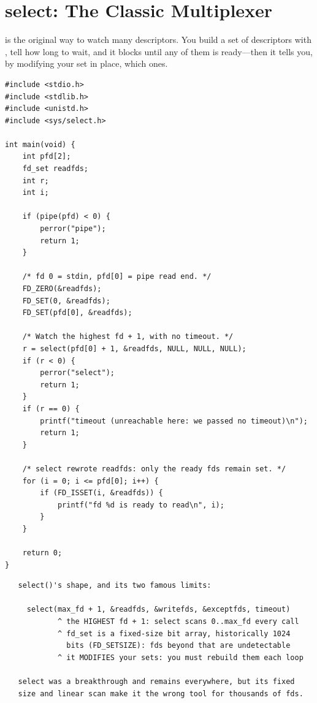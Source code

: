 \section{select: The Classic Multiplexer}

 is the original way to watch many descriptors. You build
a set of descriptors with , tell  how long
to wait, and it blocks until any of them is ready---then it tells you,
by modifying your set in place, which ones.

\begin{lstlisting}[caption={Watching stdin and a pipe with select.}]
#include <stdio.h>
#include <stdlib.h>
#include <unistd.h>
#include <sys/select.h>

int main(void) {
    int pfd[2];
    fd_set readfds;
    int r;
    int i;

    if (pipe(pfd) < 0) {
        perror("pipe");
        return 1;
    }

    /* fd 0 = stdin, pfd[0] = pipe read end. */
    FD_ZERO(&readfds);
    FD_SET(0, &readfds);
    FD_SET(pfd[0], &readfds);

    /* Watch the highest fd + 1, with no timeout. */
    r = select(pfd[0] + 1, &readfds, NULL, NULL, NULL);
    if (r < 0) {
        perror("select");
        return 1;
    }
    if (r == 0) {
        printf("timeout (unreachable here: we passed no timeout)\n");
        return 1;
    }

    /* select rewrote readfds: only the ready fds remain set. */
    for (i = 0; i <= pfd[0]; i++) {
        if (FD_ISSET(i, &readfds)) {
            printf("fd %d is ready to read\n", i);
        }
    }

    return 0;
}
\end{lstlisting}

\begin{verbatim}
   select()'s shape, and its two famous limits:

     select(max_fd + 1, &readfds, &writefds, &exceptfds, timeout)
            ^ the HIGHEST fd + 1: select scans 0..max_fd every call
            ^ fd_set is a fixed-size bit array, historically 1024
              bits (FD_SETSIZE): fds beyond that are undetectable
            ^ it MODIFIES your sets: you must rebuild them each loop

   select was a breakthrough and remains everywhere, but its fixed
   size and linear scan make it the wrong tool for thousands of fds.
\end{verbatim}

